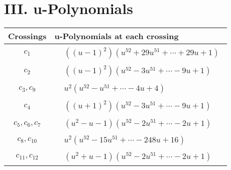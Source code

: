 \documentclass[1p]{elsarticle_modified}
\theoremstyle{definition}
\begin{document}
\centering \section*{ III. u-Polynomials}
\begin{tabular}{m{50pt}|m{274pt}}
Crossings & \hspace{64pt}u-Polynomials at each crossing \\
\hline $$\begin{aligned}c_{1}\end{aligned}$$&$\begin{aligned}
&((u-1)^2)(u^{52}+29 u^{51}+\cdots+29 u+1)
\end{aligned}$\\
\hline $$\begin{aligned}c_{2}\end{aligned}$$&$\begin{aligned}
&((u-1)^2)(u^{52}-3 u^{51}+\cdots-9 u+1)
\end{aligned}$\\
\hline $$\begin{aligned}c_{3},c_{9}\end{aligned}$$&$\begin{aligned}
&u^2(u^{52}- u^{51}+\cdots-4 u+4)
\end{aligned}$\\
\hline $$\begin{aligned}c_{4}\end{aligned}$$&$\begin{aligned}
&((u+1)^2)(u^{52}-3 u^{51}+\cdots-9 u+1)
\end{aligned}$\\
\hline $$\begin{aligned}c_{5},c_{6},c_{7}\end{aligned}$$&$\begin{aligned}
&(u^2- u-1)(u^{52}-2 u^{51}+\cdots-2 u+1)
\end{aligned}$\\
\hline $$\begin{aligned}c_{8},c_{10}\end{aligned}$$&$\begin{aligned}
&u^2(u^{52}-15 u^{51}+\cdots-248 u+16)
\end{aligned}$\\
\hline $$\begin{aligned}c_{11},c_{12}\end{aligned}$$&$\begin{aligned}
&(u^2+u-1)(u^{52}-2 u^{51}+\cdots-2 u+1)
\end{aligned}$\\
\hline
\end{tabular}\newpage\renewcommand{\arraystretch}{1}
\end{document}
